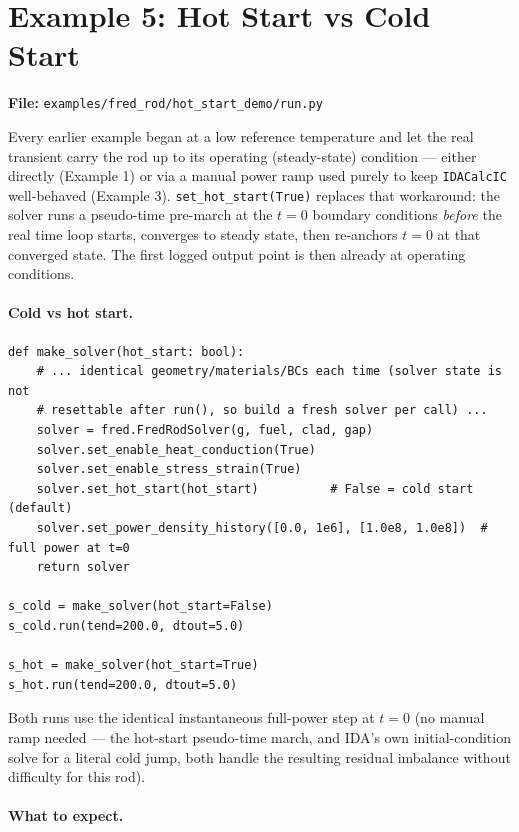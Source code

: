 \documentclass[11pt,a4paper]{article}
\begin{document}
\section{Example 5: Hot Start vs Cold Start}
\label{sec:hot-rod}

\textbf{File:} \texttt{examples/fred\_rod/hot\_start\_demo/run.py}

\medskip
Every earlier example began at a low reference temperature and let the real
transient carry the rod up to its operating (steady-state) condition ---
either directly (Example 1) or via a manual power ramp used purely to keep
\texttt{IDACalcIC} well-behaved (Example 3).  \texttt{set\_hot\_start(True)}
replaces that workaround: the solver runs a pseudo-time pre-march at the
$t=0$ boundary conditions \emph{before} the real time loop starts, converges
to steady state, then re-anchors $t=0$ at that converged state.  The first
logged output point is then already at operating conditions.

\paragraph{Cold vs hot start.}

\begin{lstlisting}
def make_solver(hot_start: bool):
    # ... identical geometry/materials/BCs each time (solver state is not
    # resettable after run(), so build a fresh solver per call) ...
    solver = fred.FredRodSolver(g, fuel, clad, gap)
    solver.set_enable_heat_conduction(True)
    solver.set_enable_stress_strain(True)
    solver.set_hot_start(hot_start)          # False = cold start (default)
    solver.set_power_density_history([0.0, 1e6], [1.0e8, 1.0e8])  # full power at t=0
    return solver

s_cold = make_solver(hot_start=False)
s_cold.run(tend=200.0, dtout=5.0)

s_hot = make_solver(hot_start=True)
s_hot.run(tend=200.0, dtout=5.0)
\end{lstlisting}

Both runs use the identical instantaneous full-power step at $t=0$ (no
manual ramp needed --- the hot-start pseudo-time march, and IDA's own
initial-condition solve for a literal cold jump, both handle the resulting
residual imbalance without difficulty for this rod).

\paragraph{What to expect.}
\end{document}
